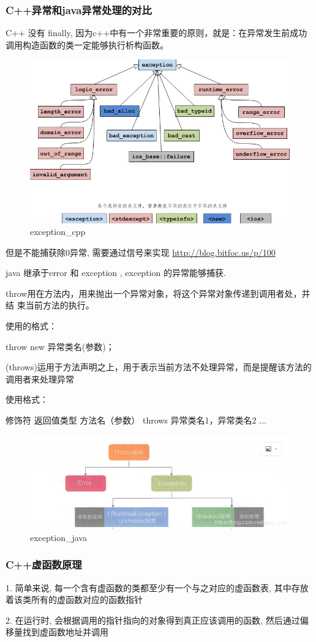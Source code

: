 \subsubsection{C++异常和java异常处理的对比}
C++ 没有 finally, 因为c++中有一个非常重要的原则，就是：在异常发生前成功调用构造函数的类一定能够执行析构函数。

\begin{figure}
	\centering
	\includegraphics[width=0.7\linewidth]{figures/exceptioncpp.png}
	\caption{exception\_cpp}
	\label{fig:exception_cpp}
\end{figure}
但是不能捕获除0异常, 需要通过信号来实现 \url{http://blog.bitfoc.us/p/100}

java 继承于error 和  exception , exception 的异常能够捕获.

throw用在方法内，用来抛出一个异常对象，将这个异常对象传递到调用者处，并结 束当前方法的执行。

使用的格式：

throw new 异常类名(参数)；


(throws)运用于方法声明之上，用于表示当前方法不处理异常，而是提醒该方法的调用者来处理异常

使用格式：

修饰符 返回值类型 方法名（参数） throws 异常类名1，异常类名2 ... { }
\begin{figure}
	\centering
	\includegraphics[width=0.7\linewidth]{figures/exceptionjava.png}
	\caption{exception\_java}
	\label{fig:exception_java}
\end{figure}


\subsubsection{C++虚函数原理}
1. 简单来说, 每一个含有虚函数的类都至少有一个与之对应的虚函数表, 其中存放着该类所有的虚函数对应的函数指针 \par
2. 在运行时, 会根据调用的指针指向的对象得到真正应该调用的函数, 然后通过偏移量找到虚函数地址并调用 \par
